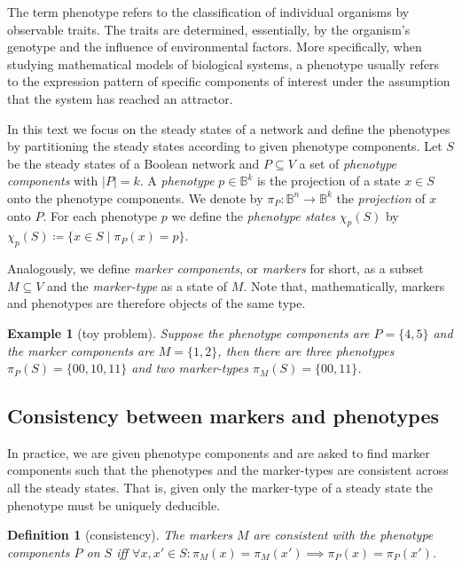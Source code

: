 \documentclass[11pt]{article}
\newtheorem{example}{Example}[section]
\newtheorem{definition}{Definition}[section]
\begin{document}
    The term phenotype refers to the classification of individual organisms by observable traits.
    The traits are determined, essentially, by the organism's genotype and the influence of environmental factors.
    More specifically, when studying mathematical models of biological systems, a phenotype usually refers to the expression pattern of specific components of interest under the assumption that the system has reached an attractor.

    In this text we focus on the steady states of a network and define the phenotypes by partitioning the steady states according to given phenotype components.
    Let $S$ be the steady states of a Boolean network and $P\subseteq V$ a set of \emph{phenotype components} with $|P|=k$.
    A \emph{phenotype} $p \in \mathbb B^k$ is the projection of a state $x \in S$ onto the phenotype components.
    We denote by $\pi_P: \mathbb B^n \rightarrow \mathbb B^k$ the \emph{projection} of $x$ onto $P$.
    For each phenotype $p$ we define the \emph{phenotype states} $\chi_p(S)$ by
    $\chi_p(S) \coloneqq \{x \in S \mid \pi_P(x) = p\}$.

    Analogously, we define \emph{marker components}, or \emph{markers} for short, as a subset $M \subseteq V$ and the \emph{marker-type} as a state of $M$.
    Note that, mathematically, markers and phenotypes are therefore objects of the same type.

    \begin{example}[toy problem]
        Suppose the phenotype components are $P=\{4,5\}$ and the marker components are $M=\{1,2\}$, then there are three phenotypes $\pi_P(S)=\{00, 10, 11\}$ and two marker-types $\pi_M(S)=\{00, 11\}$.
    \end{example}

    \subsection{Consistency between markers and phenotypes}
    In practice, we are given phenotype components and are asked to find marker components such that the phenotypes and the marker-types are consistent across all the steady states.
    That is, given only the marker-type of a steady state the phenotype must be uniquely deducible.

    \begin{definition}[consistency]
        The markers $M$ are \emph{consistent with} the phenotype components $P$ on $S$ iff $\forall x,x' \in S: \pi_M(x) = \pi_M(x') \implies \pi_P(x) = \pi_P(x')$.
    \end{definition}
\end{document}
